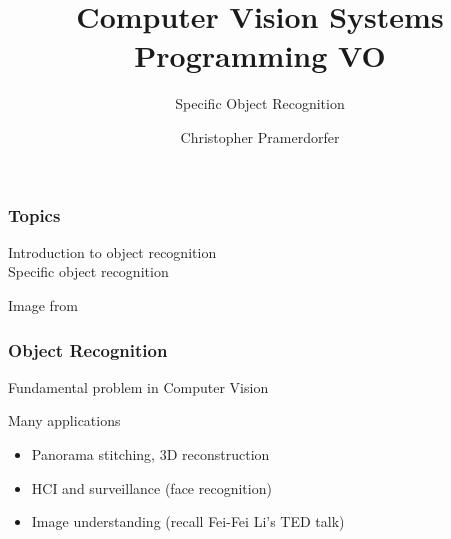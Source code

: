 \documentclass[xetex,professionalfont]{beamer}
\title{Computer Vision Systems Programming VO}
\subtitle{Specific Object Recognition}
\author{Christopher Pramerdorfer}
\institute{Computer Vision Lab, Vienna University of Technology}
\begin{document}

\begin{frame}
\maketitle
\end{frame}


\begin{frame}
\frametitle{Topics}

Introduction to object recognition \\
Specific object recognition

\bigskip
\begin{center}
    {\centering Image from \cite{grauman2011}}
\end{center}

\end{frame}


\begin{frame}
\frametitle{Object Recognition}

Fundamental problem in Computer Vision

\bigskip
Many applications
\begin{itemize}
	\item Panorama stitching, 3D reconstruction
	\item HCI and surveillance (face recognition)
	\item Image understanding (recall Fei-Fei Li's TED talk)
\end{itemize}

\end{frame}

\end{document}
